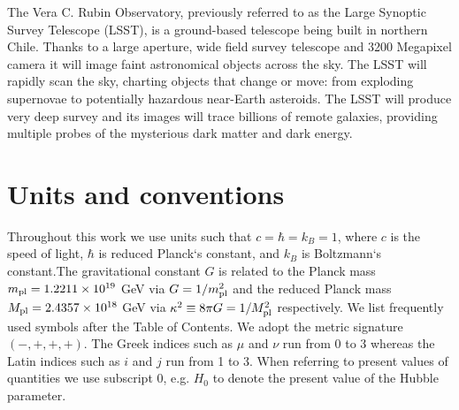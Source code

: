 
The Vera C. Rubin Observatory, previously referred to as the Large Synoptic Survey Telescope (LSST), is a ground-based telescope being built in northern Chile. Thanks to a large aperture, wide field survey telescope and 3200 Megapixel camera it will image faint astronomical objects across the sky. The LSST will rapidly scan the sky, charting objects that change or move: from exploding supernovae to potentially hazardous near-Earth asteroids. The LSST will produce very deep survey and its images will trace billions of remote galaxies, providing multiple probes of the mysterious dark matter and dark energy.


\section*{Units and conventions}

Throughout this work we use units such that $c=\hbar=k_B=1$, where $c$ is the speed of light, $\hbar$ is reduced Planck`s constant, and $k_B$ is Boltzmann`s constant.The gravitational constant $G$ is related to the Planck mass $m_{\text{\scriptsize pl}}=1.2211\times10^{19}$ GeV via $G=1/m_{\text{\scriptsize pl}}^2$ and the reduced Planck mass $M_{\text{\scriptsize pl}} = 2.4357\times10^{18}$ GeV via $\kappa^2\equiv8\pi G=1/M_{\text{\scriptsize pl}}^2$ respectively. We list frequently used symbols after the Table of Contents. We adopt the metric signature $(-, +, +, +)$. The Greek indices such as $\mu$ and $\nu$ run from 0 to 3 whereas the Latin indices such as $i$ and $j$ run from 1 to 3. When referring to present values of quantities we use subscript $0$, e.g. $H_0$ to denote the present value of the Hubble parameter.